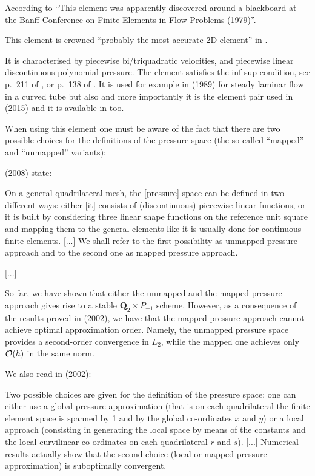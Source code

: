 According to \textcite{bobf08} 
{\color{darkgray} ``This element was apparently discovered 
around a blackboard at the Banff Conference on Finite Elements in 
Flow Problems (1979)''}.

\begin{center}

\end{center}

This element is crowned ``probably the most accurate 2D element'' in \textcite{grsa}.

It is characterised by piecewise bi/triquadratic velocities, 
and piecewise linear discontinuous polynomial pressure. 
The element satisfies the inf-sup condition, see p.~211 of \textcite{hugh}, or 
p.~138 of \textcite{elsw}.
It is used for example in \textcite{vavs89} (1989) for steady laminar flow in a curved tube
but also and more importantly it is the element pair used in \textcite{mabl15} (2015)
and it is available in \aspect too. 


When using this element one must be aware of the fact that there are 
two possible choices for the definitions of the pressure space 
(the so-called ``mapped'' and ``unmapped'' variants):

\textcite{bobf08} (2008) state: 
\begin{displayquote}
{\color{darkgray}
On a general quadrilateral mesh, the [pressure] space 
can be defined in two different ways: either [it] 
consists of (discontinuous) piecewise linear functions, or it is built
by considering three linear shape functions on the reference unit square and mapping
them to the general elements like it is usually done for continuous 
finite elements. [...] We shall refer to the first possibility as 
unmapped pressure approach and to the second one as mapped pressure approach.

[...] 

So far, we have shown that either the 
unmapped and the mapped pressure 
approach gives rise to a stable ${\bm Q}_2\times P_{-1}$ scheme. 
However, as a consequence of the
results proved in \textcite{arbf02} (2002), we have that the mapped 
pressure approach cannot achieve 
optimal approximation order. Namely, the unmapped pressure space 
provides a second-order convergence 
in $L_2$, while the mapped one achieves only ${\cal O}(h)$ in the same norm.}
\end{displayquote}

We also read in \textcite{boga02} (2002):
\begin{displayquote}
{\color{darkgray}
Two possible choices are given for the definition of the pressure space: 
one can either use a global pressure approximation (that is on
each quadrilateral the finite element space is spanned by 1 and by the 
global co-ordinates $x$ and $y$) or a local approach (consisting in generating 
the local space by means of the constants and the local curvilinear 
co-ordinates on each quadrilateral $r$ and $s$). [...] Numerical results 
actually show that the second choice (local or mapped pressure approximation) 
is suboptimally convergent.
}
\end{displayquote}

